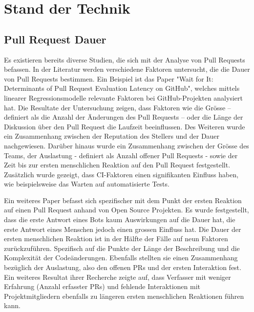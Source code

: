 \section{Stand der Technik} %

\label{Chapter3} %


\subsection{Pull Request Dauer}
Es existieren bereits diverse Studien, die sich mit der Analyse von Pull Requests befassen. In der Literatur werden verschiedene Faktoren untersucht, die die Dauer von Pull Requests bestimmen. Ein Beispiel ist das Paper "Wait for It: Determinants of Pull Request Evaluation Latency on GitHub", welches  mittels linearer Regressionsmodelle relevante Faktoren bei GitHub-Projekten analysiert hat. Die Resultate der Untersuchung zeigen, dass Faktoren wie die Grösse – definiert als die Anzahl der Änderungen des Pull Requests – oder die Länge der Diskussion über den Pull Request die Laufzeit beeinflussen. Des Weiteren wurde ein Zusammenhang zwischen der Reputation des Stellers und der Dauer nachgewiesen. Darüber hinaus wurde ein Zusammenhang zwischen der Grösse des Teams, der Auslastung - definiert als Anzahl offener Pull Requests - sowie der Zeit bis zur ersten menschlichen Reaktion auf den Pull Request festgestellt. Zusätzlich wurde gezeigt, dass CI-Faktoren einen signifikanten Einfluss haben, wie beispielsweise das Warten auf automatisierte Tests. \parencite{yu_wait_2015}

Ein weiteres Paper befasst sich spezifischer mit dem Punkt der ersten Reaktion auf einen Pull Request anhand von Open Source Projekten. Es wurde festgestellt, dass die erste Antwort eines Bots kaum Auswirkungen auf die Dauer hat, die erste Antwort eines Menschen jedoch einen grossen Einfluss hat. Die Dauer der ersten menschlichen Reaktion ist in der Hälfte der Fälle auf neun Faktoren zurückzuführen. Spezifisch auf die Punkte der Länge der Beschreibung und die Komplexität der Codeänderungen. Ebenfalls stellten sie einen Zusammenhang bezüglich der Auslastung, also den offenen PRs und der ersten Interaktion fest. Ein weiteres Resultat ihrer Recherche zeigte auf, dass Verfasser mit weniger Erfahrung (Anzahl erfasster PRs) und fehlende Interaktionen mit Projektmitgliedern ebenfalls zu längeren ersten menschlichen Reaktionen führen kann.\parencite{hasan_understanding_2023} 

